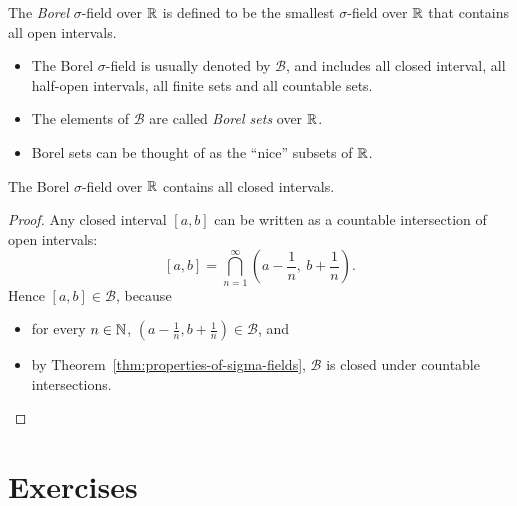 \begin{definition}
The \emph{Borel} $\sigma$-field over $\mathbb{R}$ is defined to be the smallest $\sigma$-field over $\mathbb{R}$ that contains all open intervals.
\end{definition}

\begin{remark}
\begin{itemize}
\item The Borel $\sigma$-field is usually denoted by $\mathcal{B}$, and includes all closed interval, all half-open intervals, all finite sets and all countable sets.
\item The elements of $\mathcal{B}$ are called \emph{Borel sets} over $\mathbb{R}$.
\item Borel sets can be thought of as the ``nice'' subsets of $\mathbb{R}$.
\end{itemize}
\end{remark}

\begin{proposition}
The Borel $\sigma$-field over $\mathbb{R}$ contains all closed intervals.
\end{proposition}

\begin{proof}
Any closed interval $[a,b]$ can be written as a countable intersection of open intervals:
\[
[a, b] = \bigcap_{n=1}^\infty\left(a-\frac{1}{n},\ b+\frac{1}{n}\right).
\]
Hence $[a,b]\in\mathcal{B}$, because
\begin{itemize}
\item for every $n\in\mathbb{N}$, $\displaystyle\left(a-\frac{1}{n},b+\frac{1}{n}\right)\in\mathcal{B}$, and
\item by Theorem~\ref{thm:properties-of-sigma-fields}, $\mathcal{B}$ is closed under countable intersections.
\end{itemize}
\end{proof}


\section{Exercises}


\endinput
